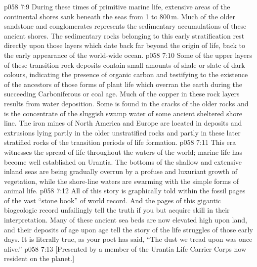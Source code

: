 \vs p058 7:9 During these times of primitive marine life, extensive areas of the continental shores sank beneath the seas from 1 to 800\,m. Much of the older sandstone and conglomerates represents the sedimentary accumulations of these ancient shores. The sedimentary rocks belonging to this early stratification rest directly upon those layers which date back far beyond the origin of life, back to the early appearance of the world\hyp{}wide ocean.
\vs p058 7:10 Some of the upper layers of these transition rock deposits contain small amounts of shale or slate of dark colours, indicating the presence of organic carbon and testifying to the existence of the ancestors of those forms of plant life which overran the earth during the succeeding Carboniferous or coal age. Much of the copper in these rock layers results from water deposition. Some is found in the cracks of the older rocks and is the concentrate of the sluggish swamp water of some ancient sheltered shore line. The iron mines of North America and Europe are located in deposits and extrusions lying partly in the older unstratified rocks and partly in these later stratified rocks of the transition periods of life formation.
\vs p058 7:11 \pc This era witnesses the spread of life throughout the waters of the world; marine life has become well established on Urantia. The bottoms of the shallow and extensive inland seas are being gradually overrun by a profuse and luxuriant growth of vegetation, while the shore\hyp{}line waters are swarming with the simple forms of animal life.
\vs p058 7:12 \pc All of this story is graphically told within the fossil pages of the vast “stone book” of world record. And the pages of this gigantic biogeologic record unfailingly tell the truth if you but acquire skill in their interpretation. Many of these ancient sea beds are now elevated high upon land, and their deposits of age upon age tell the story of the life struggles of those early days. It is literally true, as your poet has said, “The dust we tread upon was once alive.”
\vsetoff
\vs p058 7:13 [Presented by a member of the Urantia Life Carrier Corps now resident on the planet.]
\quizlink
{}

